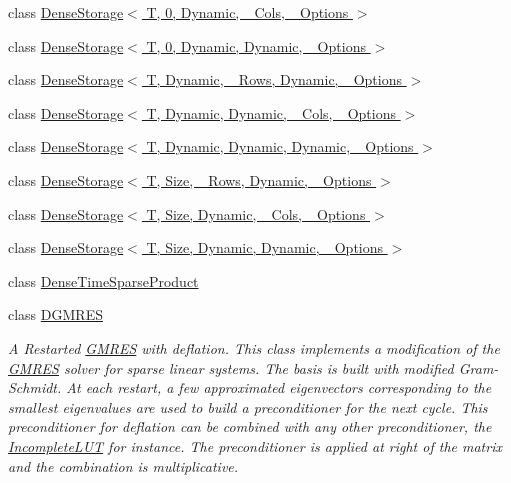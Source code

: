 \begin{DoxyCompactItemize}
\item 
class \hyperlink{class_eigen_1_1_dense_storage_3_01_t_00_010_00_01_dynamic_00_01___cols_00_01___options_01_4}{Dense\+Storage$<$ T, 0, Dynamic, \+\_\+\+Cols, \+\_\+\+Options $>$}
\item 
class \hyperlink{class_eigen_1_1_dense_storage_3_01_t_00_010_00_01_dynamic_00_01_dynamic_00_01___options_01_4}{Dense\+Storage$<$ T, 0, Dynamic, Dynamic, \+\_\+\+Options $>$}
\item 
class \hyperlink{class_eigen_1_1_dense_storage_3_01_t_00_01_dynamic_00_01___rows_00_01_dynamic_00_01___options_01_4}{Dense\+Storage$<$ T, Dynamic, \+\_\+\+Rows, Dynamic, \+\_\+\+Options $>$}
\item 
class \hyperlink{class_eigen_1_1_dense_storage_3_01_t_00_01_dynamic_00_01_dynamic_00_01___cols_00_01___options_01_4}{Dense\+Storage$<$ T, Dynamic, Dynamic, \+\_\+\+Cols, \+\_\+\+Options $>$}
\item 
class \hyperlink{class_eigen_1_1_dense_storage_3_01_t_00_01_dynamic_00_01_dynamic_00_01_dynamic_00_01___options_01_4}{Dense\+Storage$<$ T, Dynamic, Dynamic, Dynamic, \+\_\+\+Options $>$}
\item 
class \hyperlink{class_eigen_1_1_dense_storage_3_01_t_00_01_size_00_01___rows_00_01_dynamic_00_01___options_01_4}{Dense\+Storage$<$ T, Size, \+\_\+\+Rows, Dynamic, \+\_\+\+Options $>$}
\item 
class \hyperlink{class_eigen_1_1_dense_storage_3_01_t_00_01_size_00_01_dynamic_00_01___cols_00_01___options_01_4}{Dense\+Storage$<$ T, Size, Dynamic, \+\_\+\+Cols, \+\_\+\+Options $>$}
\item 
class \hyperlink{class_eigen_1_1_dense_storage_3_01_t_00_01_size_00_01_dynamic_00_01_dynamic_00_01___options_01_4}{Dense\+Storage$<$ T, Size, Dynamic, Dynamic, \+\_\+\+Options $>$}
\item 
class \hyperlink{class_eigen_1_1_dense_time_sparse_product}{Dense\+Time\+Sparse\+Product}
\item 
class \hyperlink{class_eigen_1_1_d_g_m_r_e_s}{D\+G\+M\+R\+ES}
\begin{DoxyCompactList}\small\item\em A Restarted \hyperlink{group___iterative_linear_solvers___module_class_eigen_1_1_g_m_r_e_s}{G\+M\+R\+ES} with deflation. This class implements a modification of the \hyperlink{group___iterative_linear_solvers___module_class_eigen_1_1_g_m_r_e_s}{G\+M\+R\+ES} solver for sparse linear systems. The basis is built with modified Gram-\/\+Schmidt. At each restart, a few approximated eigenvectors corresponding to the smallest eigenvalues are used to build a preconditioner for the next cycle. This preconditioner for deflation can be combined with any other preconditioner, the \hyperlink{group___iterative_linear_solvers___module_class_eigen_1_1_incomplete_l_u_t}{Incomplete\+L\+UT} for instance. The preconditioner is applied at right of the matrix and the combination is multiplicative. \end{DoxyCompactList}\item 

\end{DoxyCompactItemize}

